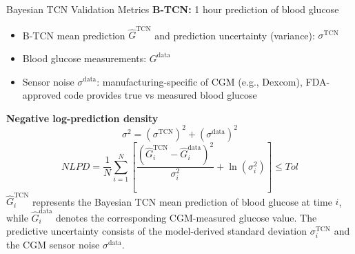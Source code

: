 \documentclass[8pt,xcolor=dvipsnames,compress]{beamer}
\begin{document}
\begin{frame}{Bayesian TCN Validation Metrics}
\textbf{B-TCN:} 1 hour prediction of blood glucose  
\begin{itemize}
    \item B-TCN mean prediction $\hat{G}^{\text{TCN}}$ and prediction uncertainty (variance): $\sigma^{\text{TCN}}$
    \item Blood glucose measurements: $G^{\text{data}}$
    \item Sensor noise $\sigma^{\text{data}}$: manufacturing-specific of CGM (e.g., Dexcom), FDA-approved code provides true vs measured blood glucose
\end{itemize}
\textbf{ Negative log-prediction density }
\[
\sigma^2 = (\sigma^{\text{TCN}})^2 + (\sigma^{\text{data}})^2
\]
\[
NLPD = 
\frac{1}{N}\sum_{i=1}^N 
\left[
\frac{\left(\hat{G}^{\text{TCN}}_i - \hat{G}^{\text{data}}_i\right)^2}{\sigma_i^2}
+ \ln(\sigma_i^2)
\right]
\leq Tol
\]
$\hat{G}^{\text{TCN}}_i$ represents the Bayesian TCN mean prediction of blood glucose at time $i$, while $\hat{G}^{\text{data}}_i$ denotes the corresponding CGM-measured glucose value. The predictive uncertainty consists of the model-derived standard deviation $\sigma^{\text{TCN}}_i$ and the CGM sensor noise $\sigma^{\text{data}}$. 

\end{frame}



\end{document}

